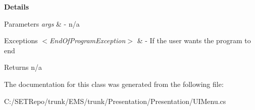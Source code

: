 {\bfseries Details}


\begin{DoxyParams}{Parameters}
{\em args} & -\/ n/a\\
\hline
\end{DoxyParams}

\begin{DoxyExceptions}{Exceptions}
{\em $<$\+End\+Of\+Program\+Exception$>$} & -\/ If the user wants the program to end\\
\hline
\end{DoxyExceptions}
\begin{DoxyReturn}{Returns}
n/a 
\end{DoxyReturn}


The documentation for this class was generated from the following file\+:\begin{DoxyCompactItemize}
\item 
C\+:/\+S\+E\+T\+Repo/trunk/\+E\+M\+S/trunk/\+Presentation/\+Presentation/U\+I\+Menu.\+cs\end{DoxyCompactItemize}

